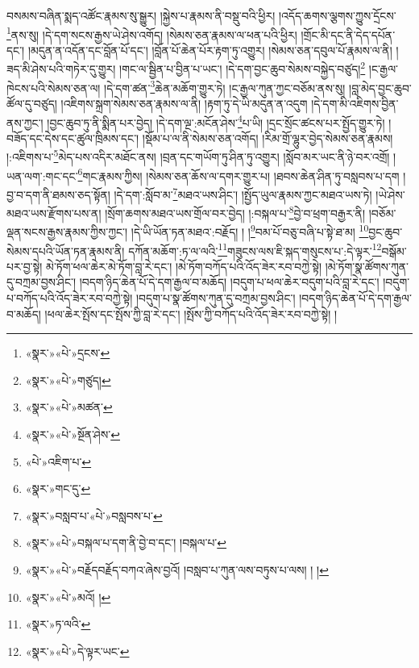 བསམས་བཞིན་སྨད་འཚོང་རྣམས་སུ་སྒྱུར། །སྐྱེས་པ་རྣམས་ནི་བསྡུ་བའི་ཕྱིར། །འདོད་ཆགས་ལྕགས་ཀྱུས་དྲོངས་\footnote{«སྣར་»«པེ་»དྲངས་}ནས་སུ། །དེ་དག་སངས་རྒྱས་ཡེ་ཤེས་འགོད། །སེམས་ཅན་རྣམས་ལ་ཕན་པའི་ཕྱིར། །གྲོང་མི་དང་ནི་དེད་དཔོན་དང་། །མདུན་ན་འདོན་དང་བློན་པོ་དང་། །བློན་པོ་ཆེན་པོར་རྟག་ཏུ་འགྱུར། །སེམས་ཅན་དབུལ་པོ་རྣམས་ལ་ནི། །ཟད་མི་ཤེས་པའི་གཏེར་དུ་གྱུར། །གང་ལ་སྦྱིན་པ་བྱིན་པ་ཡང་། །དེ་དག་བྱང་ཆུབ་སེམས་བསྐྱེད་བཙུད།\footnote{«སྣར་»«པེ་»གཙུད།} །ང་རྒྱལ་ཁེངས་པའི་སེམས་ཅན་ལ། །དེ་དག་ཚན་\footnote{«སྣར་»«པེ་»མཚན་}ཆེན་མཆོག་གྱུར་ཏེ། །ང་རྒྱལ་ཀུན་ཀྱང་བཅོམ་ནས་སུ། །བླ་མེད་བྱང་ཆུབ་ཚོལ་དུ་བཙུད། །འཇིགས་སྐྲག་སེམས་ཅན་རྣམས་ལ་ནི། །རྟག་ཏུ་དེ་ཡི་མདུན་ན་འདུག །དེ་དག་མི་འཇིགས་བྱིན་ནས་ཀྱང་། །བྱང་ཆུབ་ཏུ་ནི་སྨིན་པར་བྱེད། །དེ་དག་ལྔ་:མངོན་ཤེས་\footnote{«སྣར་»«པེ་»སྔོན་ཤེས་}པ་ཡི། །དྲང་སྲོང་ཚངས་པར་སྤྱོད་གྱུར་ཏེ། །བཟོད་དང་དེས་དང་ཚུལ་ཁྲིམས་དང་། །སྡོམ་པ་ལ་ནི་སེམས་ཅན་འགོད། །རིམ་གྲོ་ལྷུར་བྱེད་སེམས་ཅན་རྣམས། །:འཇིགས་པ་\footnote{«པེ་»འཇིག་པ་}མེད་པས་འདིར་མཐོང་ནས། །བྲན་དང་གཡོག་ཏུ་ཤིན་ཏུ་འགྱུར། །སློབ་མར་ཡང་ནི་ཉེ་བར་འགྲོ། །ཡན་ལག་:གང་དང་\footnote{«སྣར་»གང་དུ་}གང་རྣམས་ཀྱིས། །སེམས་ཅན་ཆོས་ལ་དགར་གྱུར་པ། །ཐབས་ཆེན་ཤིན་ཏུ་བསླབས་པ་དག །བྱ་བ་དག་ནི་ཐམས་ཅད་སྟོན། །དེ་དག་:སློབ་མ་\footnote{«སྣར་»བསླབ་པ་«པེ་»བསླབས་པ་}མཐའ་ཡས་ཤིང་། །སྤྱོད་ཡུལ་རྣམས་ཀྱང་མཐའ་ཡས་ཏེ། །ཡེ་ཤེས་མཐའ་ཡས་རྫོགས་པས་ན། །སྲོག་ཆགས་མཐའ་ཡས་གྲོལ་བར་བྱེད། །:བསྐལ་པ་\footnote{«སྣར་»«པེ་»བསྐལ་པ་དག་ནི་བྱེ་བ་དང་། །བསྐལ་པ་}བྱེ་བ་ཕྲག་བརྒྱར་ནི། །བཅོམ་ལྡན་སངས་རྒྱས་རྣམས་ཀྱིས་ཀྱང་། །དེ་ཡི་ཡོན་ཏན་མཐའ་:བརྗོད། ། །\footnote{«སྣར་»«པེ་»བརྗོདབརྗོད་བཀའ་ཞེས་བྱའོ། །བསླབ་པ་ཀུན་ལས་བཏུས་པ་ལས། ། །}བམ་པོ་བཅུ་བཞི་པ་སྟེ་ཐ་མ། \footnote{«སྣར་»«པེ་»མའོ། ། }བྱང་ཆུབ་སེམས་དཔའི་ཡོན་ཏན་རྣམས་ནི། དཀོན་མཆོག་:ཏ་ལ་ལའི་\footnote{«སྣར་»ཏ་ལའི་}གཟུངས་ལས་ཇི་སྐད་གསུངས་པ་:དེ་ལྟར་\footnote{«སྣར་»«པེ་»དེ་ལྟར་ཡང་}བསྒོམ་པར་བྱ་སྟེ། མེ་ཏོག་ཕལ་ཆེར་མེ་ཏོག་བླ་རེ་དང་། །མེ་ཏོག་བཀོད་པའི་འོད་ཟེར་རབ་བཀྱེ་སྟེ། །མེ་ཏོག་སྣ་ཚོགས་ཀུན་དུ་བཀྲམ་བྱས་ཤིང་། །བདག་ཉིད་ཆེན་པོ་དེ་དག་རྒྱལ་བ་མཆོད། །བདུག་པ་ཕལ་ཆེར་བདུག་པའི་བླ་རེ་དང་། །བདུག་པ་བཀོད་པའི་འོད་ཟེར་རབ་བཀྱེ་སྟེ། །བདུག་པ་སྣ་ཚོགས་ཀུན་དུ་བཀྲམ་བྱས་ཤིང་། །བདག་ཉིད་ཆེན་པོ་དེ་དག་རྒྱལ་བ་མཆོད། །ཕལ་ཆེར་སྤོས་དང་སྤོས་ཀྱི་བླ་རེ་དང་། །སྤོས་ཀྱི་བཀོད་པའི་འོད་ཟེར་རབ་བཀྱེ་སྟེ། །
